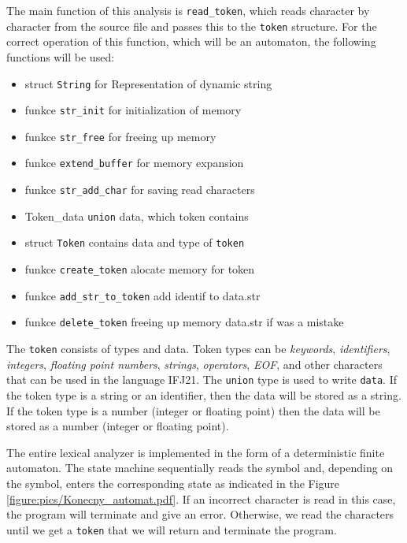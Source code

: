\documentclass[11pt]{article}
\begin{document}
The main function of this analysis is \texttt {read\_token}, which reads character by character from the source file and passes this to the \texttt{token} structure. For the correct operation of this function, which will be an automaton, the following functions will be used:
    
    \begin{itemize}
        \item struct \texttt{String} for Representation of dynamic string
        \item funkce \texttt{str\_init} for initialization of memory
        \item funkce \texttt{str\_free} for freeing up memory
        \item funkce \texttt{extend\_buffer} for memory expansion
        \item funkce \texttt{str\_add\_char} for saving read characters
        \item Token\_data \texttt{union} data, which token contains
        \item struct \texttt{Token} contains data and type of \texttt{token}
        \item funkce \texttt{create\_token} alocate memory for token
        \item funkce \texttt{add\_str\_to\_token} add identif to data.str
        \item funkce \texttt{delete\_token} freeing up memory data.str if was a mistake
    \end{itemize}
    
The \texttt{token} consists of types and data. Token types can be \textit{keywords}, \textit{identifiers}, \textit{integers}, \textit{floating point numbers}, \textit{strings}, \textit{operators}, \textit{EOF}, and other characters that can be used in the language IFJ21. The \texttt{union} type is used to write \texttt{data}. If the token type is a string or an identifier, then the data will be stored as a string. If the token type is a number (integer or floating point) then the data will be stored as a number (integer or floating point). 

The entire lexical analyzer is implemented in the form of a deterministic finite automaton. The state machine sequentially reads the symbol and, depending on the symbol, enters the corresponding state as indicated in the Figure \ref{figure:pics/Konecny_automat.pdf}. If an incorrect character is read in this case, the program will terminate and give an error. Otherwise, we read the characters until we get a \texttt{token} that we will return and terminate the program.
\end{document}
